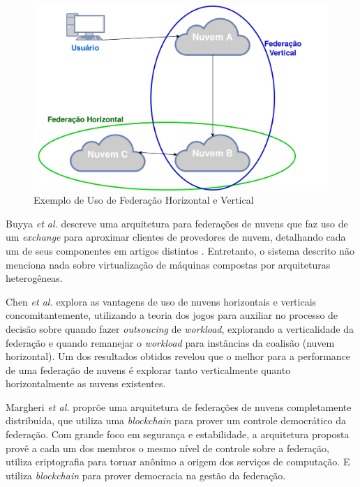 \begin{figure}[htbp]
	\centerline{\includegraphics[scale=0.032]{img/ExemploFederacao.png}}
	\caption{Exemplo de Uso de Federação Horizontal e Vertical}
	\label{ExemploFederacao}
\end{figure}


Buyya \textit{et al.} \cite{Buyya:2010:IUF:2143583.2143586} descreve uma arquitetura para federações de nuvens que faz uso de um \textit{exchange} para aproximar clientes de provedores de nuvem, detalhando cada um de seus componentes em artigos distintos \cite{Calheiros:2012:CSE:2263483.2264538} \cite{Garg2013} \cite{4539666} \cite{6063003}. Entretanto, o sistema descrito não menciona nada sobre virtualização de máquinas compostas por arquiteturas heterogêneas.

Chen \textit{et al.} \cite{7835207} explora as vantagens de uso de nuvens horizontais e verticais concomitantemente, utilizando a teoria dos jogos para auxiliar no processo de decisão sobre quando fazer \textit{outsoucing} de \textit{workload}, explorando a verticalidade da federação e quando remanejar o \textit{workload} para instâncias da coalisão (nuvem horizontal). Um dos resultados obtidos revelou que o melhor para a performance de uma federação de nuvens é explorar tanto verticalmente quanto horizontalmente as nuvens existentes.

Margheri \textit{et al.} \cite{FaaS_8030651} proprõe uma arquitetura de federações de nuvens completamente distribuída, que utiliza uma \textit{blockchain} para prover um controle democrático da federação. Com grande foco em segurança e estabilidade, a arquitetura proposta provê a cada um dos membros o mesmo nível de controle sobre a federação, utiliza criptografia para tornar anônimo a origem dos serviços de computação. E utiliza \textit{blockchain} para prover democracia na gestão da federação.

